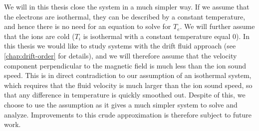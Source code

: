 We will in this thesis close the system in a much simpler way.
If we assume that the electrons are isothermal, they can be described by a constant temperature, and hence there is no need for an equation to solve for $T_e$.
We will further assume that the ions are cold ($T_i$ is isothermal with a constant temperature equal $0$).
In this thesis we would like to study systems with the drift fluid approach (see \cref{chap:drift-order} for details), and we will therefore assume that the velocity component perpendicular to the magnetic field is much less than the ion sound speed.
This is in direct contradiction to our assumption of an isothermal system, which requires that the fluid velocity is much larger than the ion sound speed, so that any difference in temperature is quickly smoothed out.
Despite of this, we choose to use the assumption as it gives a much simpler system to solve and analyze.
Improvements to this crude approximation is therefore subject to future work.
